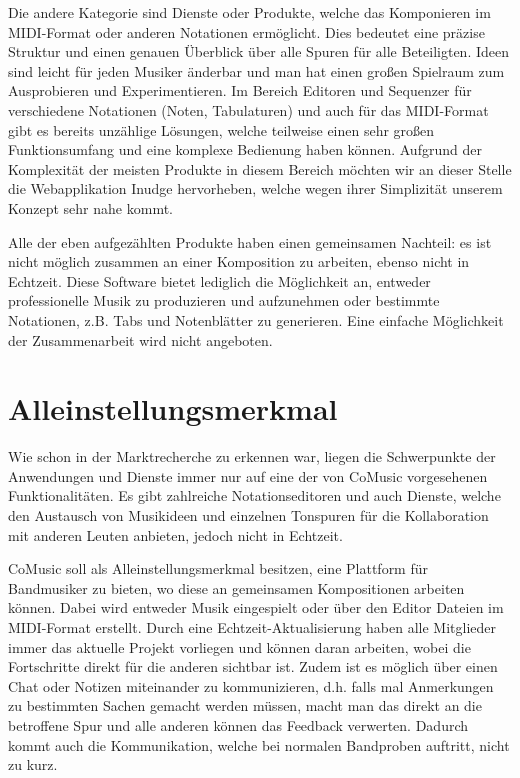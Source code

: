 \documentclass[12pt]{scrartcl}
\begin{document}
Die andere Kategorie sind Dienste oder Produkte, welche das Komponieren im MIDI-Format oder anderen Notationen ermöglicht. Dies bedeutet eine präzise Struktur und einen genauen Überblick über alle Spuren für alle Beteiligten. Ideen sind leicht für jeden Musiker änderbar und man hat einen großen Spielraum zum Ausprobieren und Experimentieren.
Im Bereich Editoren und Sequenzer für verschiedene Notationen (Noten, Tabulaturen) und auch für das MIDI-Format gibt es bereits unzählige Lösungen, welche teilweise einen sehr großen Funktionsumfang und eine komplexe Bedienung haben können.  Aufgrund der Komplexität der meisten Produkte in diesem Bereich möchten wir an dieser Stelle die Webapplikation Inudge  hervorheben, welche wegen ihrer Simplizität unserem Konzept sehr nahe kommt.

Alle der eben aufgezählten Produkte haben einen gemeinsamen Nachteil: es ist nicht möglich zusammen an einer Komposition zu arbeiten, ebenso nicht in Echtzeit. Diese Software bietet lediglich die Möglichkeit an, entweder professionelle Musik zu produzieren und aufzunehmen oder bestimmte Notationen, z.B. Tabs und Notenblätter zu generieren. Eine einfache Möglichkeit der Zusammenarbeit wird nicht angeboten.



\section{Alleinstellungsmerkmal}
Wie schon in der Marktrecherche zu erkennen war, liegen die Schwerpunkte der Anwendungen und Dienste immer nur auf eine der von CoMusic vorgesehenen Funktionalitäten. Es gibt zahlreiche Notationseditoren und auch Dienste, welche den Austausch von Musikideen und einzelnen Tonspuren für die Kollaboration mit anderen Leuten anbieten, jedoch nicht in Echtzeit.

CoMusic soll als Alleinstellungsmerkmal besitzen, eine Plattform für Bandmusiker zu bieten, wo diese an gemeinsamen Kompositionen arbeiten können. Dabei wird entweder Musik eingespielt oder über den Editor Dateien im MIDI-Format erstellt. Durch eine Echtzeit-Aktualisierung haben alle Mitglieder immer das aktuelle Projekt vorliegen und können daran arbeiten, wobei die Fortschritte direkt für die anderen sichtbar ist.
Zudem ist es möglich über einen Chat oder Notizen miteinander zu kommunizieren, d.h. falls mal Anmerkungen zu bestimmten Sachen gemacht werden müssen, macht man das direkt an die betroffene Spur und alle anderen können das Feedback verwerten. Dadurch kommt auch die Kommunikation, welche bei normalen Bandproben auftritt, nicht zu kurz.
\end{document}
